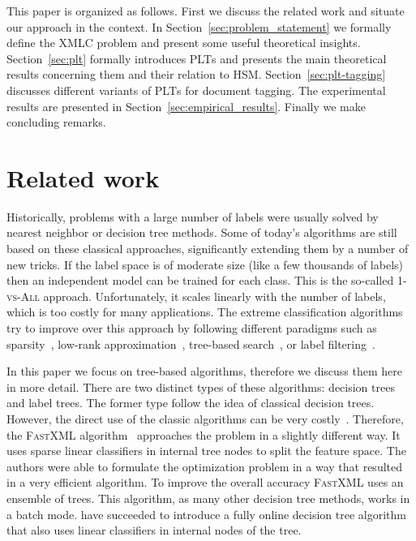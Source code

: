 \documentclass{article}
\newcommand{\Algo}[1]{\textsc{#1}}
\newcommand{\sectionBefore}{-0pt}
\newcommand{\sectionAfter}{-0pt}
\begin{document}
This paper is organized as follows. First we discuss the related work
and situate our approach in the context. In
Section~\ref{sec:problem_statement} we formally define the XMLC
problem and present some useful theoretical
insights. Section~\ref{sec:plt} formally introduces \Algo{PLT}s and
presents the main theoretical results concerning them and their
relation to \Algo{HSM}. Section~\ref{sec:plt-tagging} discusses
different variants of \Algo{PLT}s for document tagging. 
The experimental results are presented in
Section~\ref{sec:empirical_results}. 
Finally we make concluding remarks. %



\vspace{\sectionBefore}
\section{Related work}
\label{sec:related_work}
\vspace{\sectionAfter}

Historically, problems with a large number of labels were usually
solved by nearest neighbor or decision tree methods. Some of today's
algorithms are still based on these classical approaches,
significantly extending them by a number of new tricks. If the label
space is of moderate size (like a few thousands of labels) then an
independent model can be trained for each class. This is the so-called
\Algo{1-vs-All} approach. Unfortunately, it scales linearly with the
number of labels, which is too costly for many applications. The
extreme classification algorithms try to improve over this approach
by following different paradigms such as
sparsity~\citep{Yen_et_al_2017,Babbar_Scholkopf_2017}, low-rank
approximation~\cite{Mineiro_Karampatziakis_2015,Yu_et_al_2014,Bhatia_et_al_2015},
tree-based
search~\citep{Prabhu_Varma_2014,Choromanska_Langford_2015}, or label
filtering~\citep{Vijayanarasimhan_et_al_2014,Shrivastava_Li_2015,Niculescu-Mizil_Abbasnejad_2017}.

In this paper we focus on tree-based algorithms, therefore we discuss them here in more detail. 
There are two distinct types of these algorithms: decision trees and label trees. 
The former type follow the idea of classical decision trees. 
However, the direct use of the classic algorithms can be very costly~\citep{Agrawal_et_al_2013}. 
Therefore, the \Algo{FastXML} algorithm~\citep{Prabhu_Varma_2014} approaches the problem in a slightly different way. 
It uses sparse linear classifiers in internal tree nodes to split the feature space. 
The authors were able to formulate the optimization problem in a way that resulted in a very efficient algorithm. 
To improve the overall accuracy \Algo{FastXML} uses an ensemble of trees. 
This algorithm, as many other decision tree methods, works in a batch mode. 
\citet{Choromanska_Langford_2015} have succeeded to introduce a fully online decision tree algorithm 
that also uses linear classifiers in internal nodes of the tree.
\end{document}
